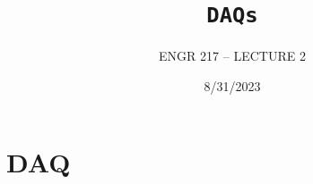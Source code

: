 \documentclass[a4paper,12pt]{article}
\title{\texttt{DAQs}\\\hrulefill}
\author{ENGR 217 – LECTURE 2}
\date{\small{8/31/2023}}
\begin{document}
    \maketitle

    \section{DAQ}
        
\end{document}
